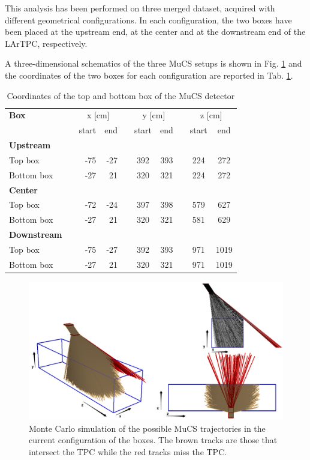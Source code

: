\documentclass[a4paper]{scrartcl}
\renewcommand{\arraystretch}{1.2}
\newcommand{\ra}[1]{\renewcommand{\arraystretch}{#1}}
\begin{document}
This analysis has been performed on three merged dataset, acquired with different geometrical configurations. In each configuration, the two boxes have been placed at the upstream end, at the center and at the downstream end of the LArTPC, respectively.

A three-dimensional schematics of the three MuCS setups is shown in Fig. \ref{fig:mucs} and the coordinates of the two boxes for each configuration are reported in Tab. \ref{tab:mucs}.
\begin{table}[htbp]
\centering
\ra{1.2}
\begin{tabular}{lcrrrccccc}
\toprule
\textbf{Box} & \phantom{abc}& \multicolumn{2}{c}{x [cm]} & \phantom{abc} & \multicolumn{2}{c}{y [cm]} & \phantom{abc} & \multicolumn{2}{c}{z [cm]}\\
\cmidrule{3-4} \cmidrule{6-7} \cmidrule{9-10}
 & & start & end & & start & end & & start & end\\
\midrule

\textbf{Upstream} & & & & & & & & & \\
Top box & & -75 & -27 & & 392 & 393 & & 224 & 272\\
Bottom box & & -27 & 21 & & 320 & 321 & & 224 & 272\\

\midrule
\textbf{Center} & & & & & & & & & \\
Top box & & -72 & -24 & & 397 & 398 & & 579 & 627\\
Bottom box & & -27 & 21 & & 320 & 321 & & 581 & 629\\
\midrule
\textbf{Downstream} & & & & & & & & & \\
Top box & & -75 & -27 & & 392 & 393 & & 971 & 1019\\
Bottom box & & -27 & 21 & & 320 & 321 & & 971 & 1019\\
\bottomrule

\end{tabular}
\caption{Coordinates of the top and bottom box of the MuCS detector}\label{tab:mucs}
\end{table}

\begin{figure}[htbp]
\includegraphics[width=\linewidth]{figures/mucs.png}
\caption{Monte Carlo simulation of the possible MuCS trajectories in the current configuration of the boxes. The brown tracks are those that intersect the TPC while the red tracks miss the TPC.} \label{fig:mucs}
\end{figure}
\end{document}
